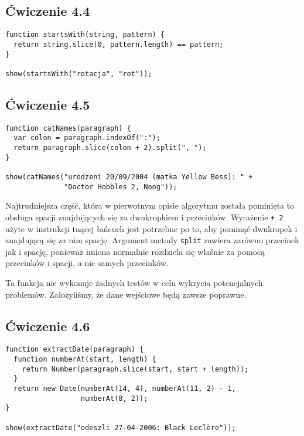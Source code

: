 \subsection*{Ćwiczenie 4.4}
\label{sol:4.4}
 
\begin{verbatim} 
function startsWith(string, pattern) {
  return string.slice(0, pattern.length) == pattern;
}

show(startsWith("rotacja", "rot"));
\end{verbatim}


\subsection*{Ćwiczenie 4.5}
\label{sol:4.5}

\begin{verbatim} 
function catNames(paragraph) {
  var colon = paragraph.indexOf(":");
  return paragraph.slice(colon + 2).split(", ");
}

show(catNames("urodzeni 20/09/2004 (matka Yellow Bess): " +
              "Doctor Hobbles 2, Noog"));
\end{verbatim}
      
Najtrudniejsza część, która w pierwotnym opisie algorytmu została pominięta to obsługa spacji znajdujących się za dwukropkiem i przecinków. Wyrażenie \texttt{+ 2} użyte w instrukcji tnącej łańcuch jest potrzebne po to, aby pominąć dwukropek i znajdującą się za nim spację. Argument metody \texttt{split} zawiera zarówno przecinek jak i spację, ponieważ imiona normalnie rozdziela się właśnie za pomocą przecinków i spacji, a nie samych przecinków.

      
Ta funkcja nie wykonuje żadnych testów w celu wykrycia potencjalnych problemów. Założyliśmy, że dane wejściowe będą zawsze poprawne.

    
\subsection*{Ćwiczenie 4.6}
\label{sol:4.6}
      
\begin{verbatim} 
function extractDate(paragraph) {
  function numberAt(start, length) {
    return Number(paragraph.slice(start, start + length));
  }
  return new Date(numberAt(14, 4), numberAt(11, 2) - 1,
                  numberAt(8, 2));
}

show(extractDate("odeszli 27-04-2006: Black Leclère"));
 \end{verbatim}
      
